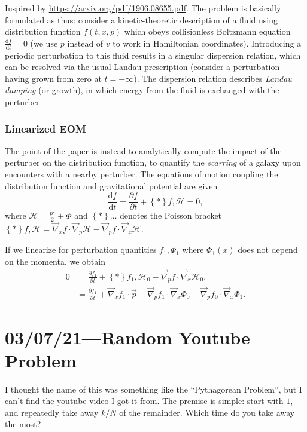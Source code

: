 \documentclass[12pt]{report}
\newcommand*{\rd}[2]{\frac{\mathrm{d}#1}{\mathrm{d}#2}}
\newcommand*{\pd}[2]{\frac{\partial#1}{\partial#2}}
\newcommand*{\z}[1]{\left\{#1\right\}}
\begin{document}
Inspired by \url{https://arxiv.org/pdf/1906.08655.pdf}. The problem is basically
formulated as thus: consider a kinetic-theoretic description of a fluid using
distribution function $f(t, x, p)$ which obeys collisionless Boltzmann equation
$\rd{f}{t} = 0$ (we use $p$ instead of $v$ to work in Hamiltonian coordinates).
Introducing a periodic perturbation to this fluid results in a singular
dispersion relation, which can be resolved via the usual Landau prescription
(consider a perturbation having grown from zero at $t=-\infty$). The dispersion
relation describes \emph{Landau damping} (or growth), in which energy from the
fluid is exchanged with the perturber.

\subsection{Linearized EOM}

The point of the paper is instead to analytically compute the impact of the
perturber on the distribution function, to quantify the \emph{scarring} of a
galaxy upon encounters with a nearby perturber. The equations of motion coupling
the distribution function and gravitational potential are given
\begin{equation}
    \rd{f}{t} = \pd{f}{t} + \z*{f, \mathcal{H}} = 0,
\end{equation}
where $\mathcal{H} = \frac{p^2}{2} + \Phi$ and $\z*{\dots}$ denotes the Poisson
bracket $\z*{f, \mathcal{H}} = \vec{\nabla}_xf \cdot \vec{\nabla}_p \mathcal{H}
- \vec{\nabla}_pf \cdot \vec{\nabla}_x\mathcal{H}$.

If we linearize for perturbation quantities $f_1, \Phi_1$ where $\Phi_1(x)$ does
not depend on the momenta, we obtain
\begin{align*}
    0 &= \pd{f_1}{t} + \z*{f_1, \mathcal{H}_0}
            - \vec{\nabla}_pf \cdot \vec{\nabla}_x \mathcal{H}_0,\\
        &= \pd{f_1}{t} + \vec{\nabla}_x f_1 \cdot \vec{p}
            - \vec{\nabla}_p f_1 \cdot \vec{\nabla}_x \Phi_0
            - \vec{\nabla}_p f_0 \cdot \vec{\nabla}_x \Phi_1.
\end{align*}

\chapter{03/07/21---Random Youtube Problem}

I thought the name of this was something like the ``Pythagorean Problem'', but I
can't find the youtube video I got it from. The premise is simple: start with
$1$, and repeatedly take away $k / N$ of the remainder. Which time
do you take away the most?
\end{document}
